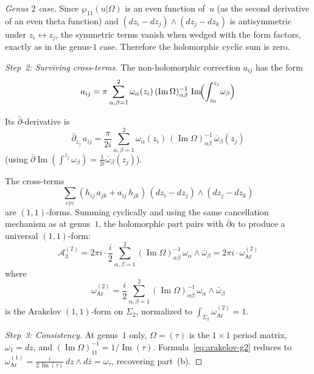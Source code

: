 \begin{proof}[Genus $2$ case]
Since $\wp_{11}(u|\Omega)$ is an even function of~$u$ (as the second
derivative of an even theta function) and
$(dz_i - dz_j) \wedge (dz_j - dz_k)$ is antisymmetric under
$z_i \leftrightarrow z_j$, the symmetric terms vanish when wedged
with the form factors, exactly as in the genus-$1$ case.
Therefore the holomorphic cyclic sum is zero.

\emph{Step~2: Surviving cross-terms.}
The non-holomorphic correction $a_{ij}$ has the form
\begin{equation}
a_{ij} = \pi \sum_{\alpha,\beta=1}^{2}
 \omega_\alpha(z_i)\,(\operatorname{Im}\Omega)^{-1}_{\alpha\beta}\,
 \operatorname{Im}\!\Bigl(\int_{z_0}^{z_j}\!\omega_\beta\Bigr)
\end{equation}

Its $\bar\partial$-derivative is
\begin{equation}\label{eq:dbar-a-g2}
\bar\partial_{z_j}\, a_{ij}
= \frac{\pi}{2i} \sum_{\alpha,\beta=1}^{2}
 \omega_\alpha(z_i)\,(\operatorname{Im}\Omega)^{-1}_{\alpha\beta}\,
 \bar\omega_\beta(z_j)
\end{equation}
(using $\bar\partial \operatorname{Im}(\int^{z_j}\omega_\beta)
= \frac{1}{2i}\bar\omega_\beta(z_j)$).

The cross-terms
\[
\sum_{\mathrm{cyc}} (h_{ij}\,a_{jk} + a_{ij}\,h_{jk})
\,(dz_i - dz_j) \wedge (dz_j - dz_k)
\]
are $(1,1)$-forms. Summing cyclically and using the same cancellation
mechanism as at genus~$1$, the holomorphic part pairs with
$\bar\partial a$ to produce a universal $(1,1)$-form:
\begin{equation}\label{eq:arnold-g2-result}
\mathcal{A}_3^{(2)} = 2\pi i \cdot
\frac{i}{2}\sum_{\alpha,\beta=1}^{2}
 (\operatorname{Im}\Omega)^{-1}_{\alpha\beta}\,
 \omega_\alpha \wedge \bar\omega_\beta
= 2\pi i \cdot \omega_{\mathrm{Ar}}^{(2)}
\end{equation}
where
\begin{equation}\label{eq:arakelov-g2}
\omega_{\mathrm{Ar}}^{(2)}
= \frac{i}{2}\sum_{\alpha,\beta=1}^{2}
 (\operatorname{Im}\Omega)^{-1}_{\alpha\beta}\,
 \omega_\alpha \wedge \bar\omega_\beta
\end{equation}
is the Arakelov $(1,1)$-form on $\Sigma_2$, normalized to
$\int_{\Sigma_2} \omega_{\mathrm{Ar}}^{(2)} = 1$.

\emph{Step~3: Consistency.}
At genus~$1$ only, $\Omega = (\tau)$ is the $1\times 1$ period matrix, $\omega_1 = dz$, and
$(\operatorname{Im}\Omega)^{-1}_{11} = 1/\operatorname{Im}(\tau)$.
Formula~\eqref{eq:arakelov-g2} reduces to
$\omega_{\mathrm{Ar}}^{(1)}
= \frac{i}{2\,\operatorname{Im}(\tau)}\,dz \wedge d\bar{z}
= \omega_\tau$,
recovering part~(b).
\end{proof}

